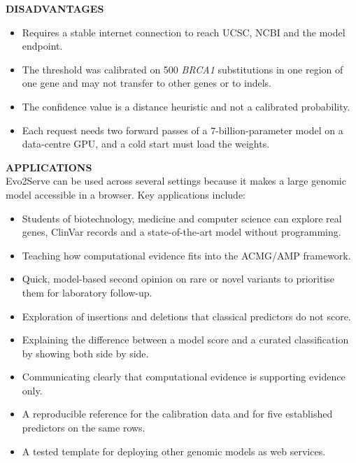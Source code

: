 \textbf{DISADVANTAGES}
\begin{itemize}
\item Requires a stable internet connection to reach UCSC, NCBI and the model endpoint.
\item The threshold was calibrated on 500 \textit{BRCA1} substitutions in one region of one gene and may not transfer to other genes or to indels.
\item The confidence value is a distance heuristic and not a calibrated probability.
\item Each request needs two forward passes of a 7-billion-parameter model on a data-centre GPU, and a cold start must load the weights.
\end{itemize}

\textbf{APPLICATIONS}\\
Evo2Serve can be used across several settings because it makes a large genomic model accessible in a browser. Key applications include:

\begin{itemize}
\item Students of biotechnology, medicine and computer science can explore real genes, ClinVar records and a state-of-the-art model without programming.
\item Teaching how computational evidence fits into the ACMG/AMP framework.
\end{itemize}

\begin{itemize}
\item Quick, model-based second opinion on rare or novel variants to prioritise them for laboratory follow-up.
\item Exploration of insertions and deletions that classical predictors do not score.
\end{itemize}

\begin{itemize}
\item Explaining the difference between a model score and a curated classification by showing both side by side.
\item Communicating clearly that computational evidence is supporting evidence only.
\end{itemize}

\begin{itemize}
\item A reproducible reference for the calibration data and for five established predictors on the same rows.
\item A tested template for deploying other genomic models as web services.
\end{itemize}

